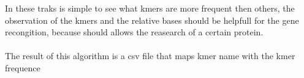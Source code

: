 In these traks is simple to see what kmers are more frequent then others, the observation of the kmers and the relative bases should be helpfull for the gene recongition, because should allows the reasearch of a certain protein.\\\\
The result of this algorithm is a csv file that maps kmer name with the kmer frequence				
